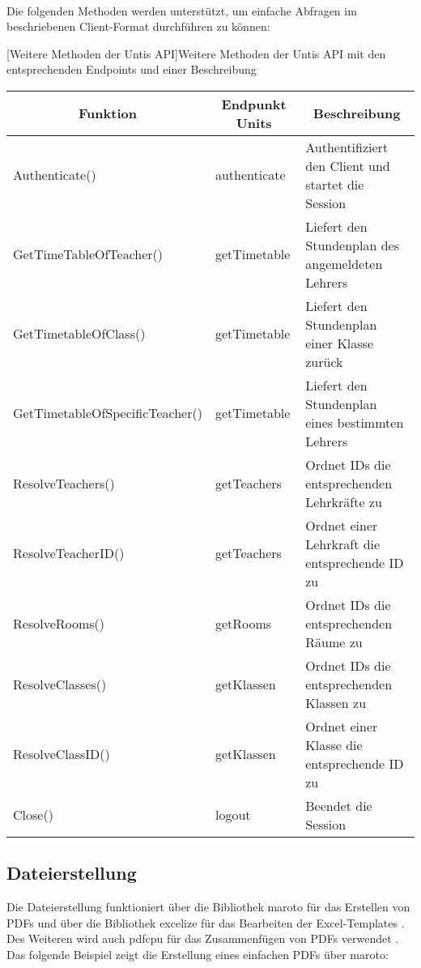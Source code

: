 ~\\Die folgenden Methoden werden unterstützt, um einfache Abfragen im beschriebenen Client-Format durchführen zu können:

\newpage

[Weitere Methoden der Untis API]{Weitere Methoden der Untis API mit den entsprechenden Endpoints und einer Beschreibung \cite{untis}}
\begin{table}
	\begin{tabular}{|l|l|l|}
		\hline
		\multicolumn{1}{|c|}{\textbf{Funktion}} & \multicolumn{1}{c|}{\textbf{Endpunkt Units}} & \multicolumn{1}{c|}{\textbf{Beschreibung}} \\ \hline
		Authenticate() & authenticate & Authentifiziert den Client und startet die Session \\ \hline
		GetTimeTableOfTeacher() & getTimetable & Liefert den Stundenplan des angemeldeten Lehrers \\ \hline
		GetTimetableOfClass() & getTimetable & Liefert den Stundenplan einer Klasse zurück \\ \hline
		GetTimetableOfSpecificTeacher() & getTimetable & Liefert den Stundenplan eines bestimmten Lehrers \\ \hline
		ResolveTeachers() & getTeachers & Ordnet IDs die entsprechenden Lehrkräfte zu \\ \hline
		ResolveTeacherID() & getTeachers & Ordnet einer Lehrkraft die entsprechende ID zu \\ \hline
		ResolveRooms() & getRooms & Ordnet IDs die entsprechenden Räume zu \\ \hline
		ResolveClasses() & getKlassen & Ordnet IDs die entsprechenden Klassen zu \\ \hline
		ResolveClassID() & getKlassen & Ordnet einer Klasse die entsprechende ID zu \\ \hline
		Close() & logout & Beendet die Session \\ \hline
	\end{tabular}
\end{table}
\newpage
\subsection{Dateierstellung}


Die Dateierstellung funktioniert über die Bibliothek maroto für das Erstellen von PDFs und über die Bibliothek excelize für das Bearbeiten der Excel-Templates \cite{marotoart} \cite{maroto} \cite{excelize}. Des Weiteren wird auch pdfcpu für das Zusammenfügen von PDFs verwendet \cite{pdfcpu}. Das folgende Beispiel zeigt die Erstellung eines einfachen PDFs über maroto:

